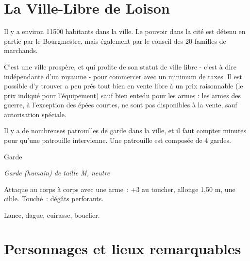 \documentclass[a4paper,10pt,openany]{book}
\begin{document}
\begin{multicols}{2}

\section{La Ville-Libre de Loison}
Il y a environ 11500 habitants dans la ville. Le pouvoir dans la cité est détenu en partie par le Bourgmestre, mais également par le conseil des 20
familles de marchands.\par C’est une ville prospère, et qui profite de son statut de ville libre - c’est à dire indépendante d’un royaume - pour
commercer avec un minimum de taxes. Il est possible d’y trouver a peu prés tout bien en vente libre à un prix raisonnable (le prix indiqué pour
l’équipement) sauf bien entedu pour les armes : les armes des guerre, à l’exception des épées courtes, ne sont pas disponibles à la vente, sauf
autorisation spéciale.\par Il y a de nombreuses patrouilles de garde dans la ville, et il faut compter  minutes pour qu’une patrouille
intervienne. Une patrouille est composée de 4 gardes.

\begin{monsterbox}{Garde}
	\begin{hangingpar}
		\textit{Garde (humain) de taille M, neutre}
	\end{hangingpar}
	\dndline%
	\basics[%
	armorclass = {16 (cuirasse, bouclier)},
	hitpoints  = \dice{2d8+2},
	speed      = 9 m
	]
	\dndline%
	\stats[
	STR = \stat{13},
	CON = \stat{12}
	]
	\dndline%
	\details[%
	senses= Perception passive 10,
	languages = {bas-thrain, vethrain},
	challenge= 1/8
	]
	\dndline%
	\begin{monsteraction}[Lance]
		Attaque au corps à corps avec une arme : +3 au toucher, allonge 1,50 m, une cible. Touché :  dégâts perforants.
	\end{monsteraction}
	\dndline%
	\begin{monsteraction}[Possessions]
		Lance, dague, cuirasse, bouclier.
	\end{monsteraction}
\end{monsterbox}

\section{Personnages et lieux remarquables}

\end{multicols}
\end{document}
